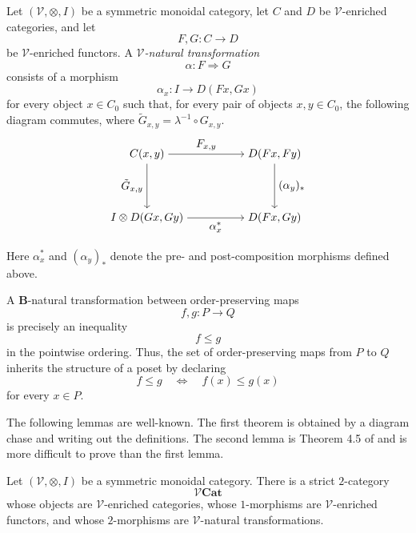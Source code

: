 \documentclass{tac}
\begin{document}
\begin{definition}
Let $(\mathcal{V},\otimes,I)$ be a symmetric monoidal category, let $C$ and
$D$ be $\mathcal{V}$-enriched categories, and let
\[
F,G:C\to D
\]
be $\mathcal{V}$-enriched functors. A
\emph{$\mathcal{V}$-natural transformation}
\[
\alpha:F\Rightarrow G
\]
consists of a morphism
\[
\alpha_x:I\to D(Fx,Gx)
\]
for every object $x\in C_0$ such that, for every pair of objects
$x,y\in C_0$, the following diagram commutes, where $\tilde{G}_{x,y}=\lambda^{-1}\circ G_{x,y}$.
\[
\begin{tikzpicture}
    \node (A) at (0,0)
    {$C(x,y)$};

    \node (B) at (4,0)
    {$D(Fx,Fy)$};

    \node (C) at (0,-2)
    {$I\otimes D(Gx,Gy)$};

    \node (D) at (4,-2)
    {$D(Fx,Gy)$};

    \draw[->] (A)--node[above]{$F_{x,y}$}(B);
    \draw[->] (A)--node[left]{$\tilde{G}_{x,y}$}(C);
    \draw[->] (B)--node[right]{$(\alpha_y)_*$}(D);
    \draw[->] (C)--node[below]{$\alpha_x^*$}(D);
\end{tikzpicture}
\]
Here $\alpha_x^*$ and $(\alpha_y)_*$ denote the pre- and post-composition
morphisms defined above.
\end{definition}



\begin{example}
A $\mathbf{B}$-natural transformation between order-preserving maps
\[
f,g:P\to Q
\]
is precisely an inequality
\[
f\leq g
\]
in the pointwise ordering. Thus, the set of order-preserving maps from $P$ to
$Q$ inherits the structure of a poset by declaring
\[
f\leq g
\quad\Longleftrightarrow\quad
f(x)\leq g(x)
\]
for every $x\in P$.
\end{example}

The following lemmas are well-known. The first theorem is obtained by a diagram chase and writing out the definitions. The second lemma is Theorem 4.5 of \cite{KellyLack2001} and is more difficult to prove than the first lemma.

\begin{lemma}
Let $(\mathcal{V},\otimes,I)$ be a symmetric monoidal category. There is a
strict $2$-category
\[
\mathcal{V}\mathbf{Cat}
\]
whose objects are $\mathcal{V}$-enriched categories, whose $1$-morphisms are
$\mathcal{V}$-enriched functors, and whose $2$-morphisms are
$\mathcal{V}$-natural transformations.
\end{lemma}
\end{document}
